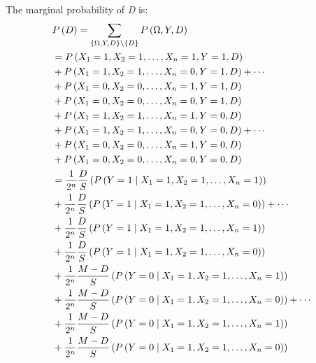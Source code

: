 \documentclass{article}
\numberwithin{equation}{section}
\numberwithin{figure}{section}
\numberwithin{table}{section}
\begin{document}
The marginal probability of \textit{D} is:
\begin{align*}
&P\left(D\right)=\sum_{\left\{\mathrm{\Omega },Y,D\right\}\backslash \left\{D\right\}}{P\left(\mathrm{\Omega },Y,D\right)}\\
&=P\left(X_1=1,X_2=1,\dots ,X_n=1,Y=1,D\right)\\
&+P\left(X_1=1,X_2=1,\dots ,X_n=0,Y=1,D\right)+\cdots \\
&+P\left(X_1=0,X_2=0,\dots ,X_n=1,Y=1,D\right)\\
&+P\left(X_1=0,X_2=0,\dots ,X_n=0,Y=1,D\right)\\
&+P\left(X_1=1,X_2=1,\dots ,X_n=1,Y=0,D\right)\\
&+P\left(X_1=1,X_2=1,\dots ,X_n=0,Y=0,D\right)+\cdots \\
&+P\left(X_1=0,X_2=0,\dots ,X_n=1,Y=0,D\right)\\
&+P\left(X_1=0,X_2=0,\dots ,X_n=0,Y=0,D\right)\\
&=\frac{1}{2^n}\frac{D}{S}\left(P\left(Y=1\mathrel{\left|\vphantom{Y=1 X_1=1,X_2=1,\dots ,X_n=1}\right.\kern-\nulldelimiterspace}X_1=1,X_2=1,\dots ,X_n=1\right)\right)\\
&+\frac{1}{2^n}\frac{D}{S}\left(P\left(Y=1\mathrel{\left|\vphantom{Y=1 X_1=1,X_2=1,\dots ,X_n=0}\right.\kern-\nulldelimiterspace}X_1=1,X_2=1,\dots ,X_n=0\right)\right)+\cdots \\
&+\frac{1}{2^n}\frac{D}{S}\left(P\left(Y=1\mathrel{\left|\vphantom{Y=1 X_1=1,X_2=1,\dots ,X_n=1}\right.\kern-\nulldelimiterspace}X_1=1,X_2=1,\dots ,X_n=1\right)\right)\\
&+\frac{1}{2^n}\frac{D}{S}\left(P\left(Y=1\mathrel{\left|\vphantom{Y=1 X_1=1,X_2=1,\dots ,X_n=0}\right.\kern-\nulldelimiterspace}X_1=1,X_2=1,\dots ,X_n=0\right)\right)\\
&+\frac{1}{2^n}\frac{M-D}{S}\left(P\left(Y=0\mathrel{\left|\vphantom{Y=0 X_1=1,X_2=1,\dots ,X_n=1}\right.\kern-\nulldelimiterspace}X_1=1,X_2=1,\dots ,X_n=1\right)\right)\\
&+\frac{1}{2^n}\frac{M-D}{S}\left(P\left(Y=0\mathrel{\left|\vphantom{Y=0 X_1=1,X_2=1,\dots ,X_n=0}\right.\kern-\nulldelimiterspace}X_1=1,X_2=1,\dots ,X_n=0\right)\right)+\cdots \\
&+\frac{1}{2^n}\frac{M-D}{S}\left(P\left(Y=0\mathrel{\left|\vphantom{Y=0 X_1=1,X_2=1,\dots ,X_n=1}\right.\kern-\nulldelimiterspace}X_1=1,X_2=1,\dots ,X_n=1\right)\right)\\
&+\frac{1}{2^n}\frac{M-D}{S}\left(P\left(Y=0\mathrel{\left|\vphantom{Y=0 X_1=1,X_2=1,\dots ,X_n=0}\right.\kern-\nulldelimiterspace}X_1=1,X_2=1,\dots ,X_n=0\right)\right)
\end{align*}
\end{document}
